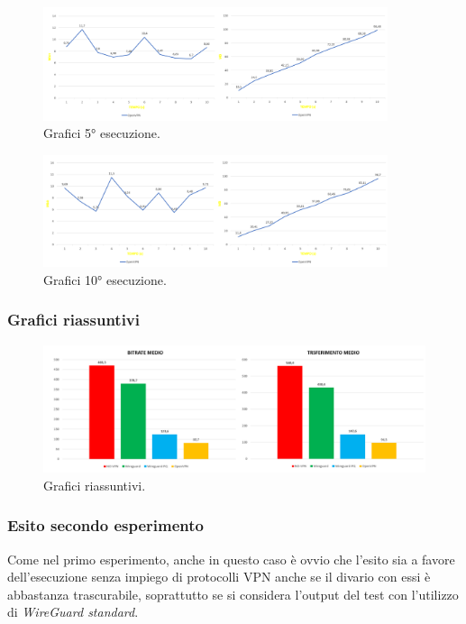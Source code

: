 \begin{figure}[h] \includegraphics[width=0.9\textwidth] {Tesi magistrale/capitoli/images/24.png}
\centering
\caption{Grafici 5° esecuzione.}
\end{figure}

\begin{figure}[h] \includegraphics[width=0.9\textwidth] {Tesi magistrale/capitoli/images/25.png}
\centering
\caption{Grafici 10° esecuzione.}
\end{figure}

\newpage
\subsubsection{Grafici riassuntivi}

\begin{figure}[h] \includegraphics[width=1\textwidth] {Tesi magistrale/capitoli/images/26.png}
\centering
\caption{Grafici riassuntivi.}
\end{figure}

\subsubsection{Esito secondo esperimento}
Come nel primo esperimento, anche in questo caso è ovvio che l'esito sia a favore dell'esecuzione senza impiego di protocolli VPN anche se il divario con essi è abbastanza trascurabile, soprattutto se si considera l'output del test con l'utilizzo di \emph{WireGuard standard}.

